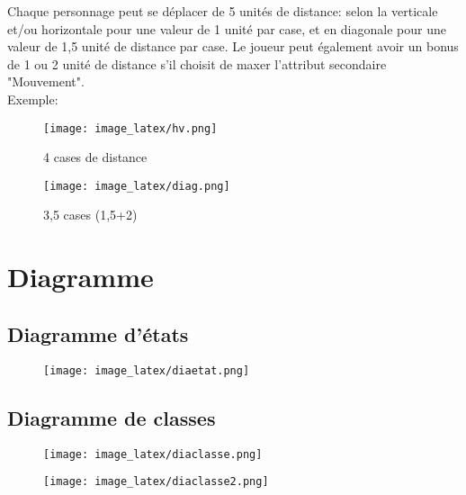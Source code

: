 \documentclass[a4paper,12pt]{report}
\begin{document}
	Chaque personnage peut se déplacer de 5 unités de distance: selon la verticale et/ou horizontale pour une valeur de 1 unité par case, et en diagonale pour une valeur de 1,5 unité de distance par case. Le joueur peut également avoir un bonus de 1 ou 2 unité de distance s'il choisit de maxer l'attribut secondaire "Mouvement".\\ Exemple:
	\begin{figure*}[h]
		\centering
		\begin{subfigure}[b]{0.4\linewidth}
			\centering
			\texttt{[image: image\_latex/hv.png]}
			\caption{4 cases de distance} 
		\end{subfigure}
		\begin{subfigure}[b]{0.4\linewidth}
			\centering
			\texttt{[image: image\_latex/diag.png]}
			\caption{3,5 cases (1,5+2)}
		\end{subfigure}
	\end{figure*}
	
	\newpage
	
	\section{Diagramme}
	\subsection{Diagramme d'états}
	
	\begin{figure}[h!]
		\centering
		\texttt{[image: image\_latex/diaetat.png]}
		
	\end{figure}
	\newpage
	\subsection{Diagramme de classes}
	\begin{figure}[h!]
		\centering
		\texttt{[image: image\_latex/diaclasse.png]}
		
	\end{figure}

	\begin{figure}[h!]
		\centering
		\texttt{[image: image\_latex/diaclasse2.png]}
		
	\end{figure}
	
\end{document}
